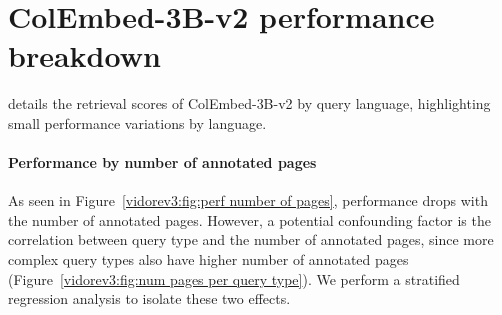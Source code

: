 


\section{ColEmbed-3B-v2 performance breakdown}\label{vidorev3:appendix: colembed-v2-perf-breakdown}

 details the retrieval scores of ColEmbed-3B-v2 by query language, highlighting small performance variations by language.


\paragraph{Performance by number of annotated pages}

As seen in Figure~\ref{vidorev3:fig:perf number of pages}, performance drops with the number of annotated pages. However, a potential confounding factor is the correlation between query type and the number of annotated pages, since more complex query types also have higher number of annotated pages (Figure~\ref{vidorev3:fig:num pages per query type}). We perform a stratified regression analysis to isolate these two effects.



